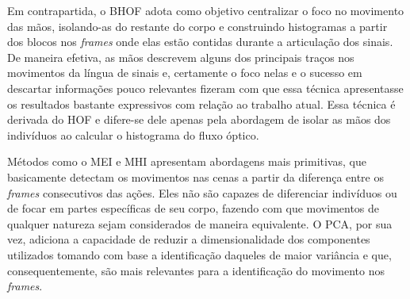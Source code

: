 Em contrapartida, o BHOF \cite{lim-2016} adota como objetivo centralizar o foco no movimento das mãos, isolando-as do restante do corpo e construindo histogramas a partir dos blocos nos \textit{frames} onde elas estão contidas durante a articulação dos sinais. De maneira efetiva, as mãos descrevem alguns dos principais traços nos movimentos da língua de sinais e, certamente o foco nelas e o sucesso em descartar informações pouco relevantes fizeram com que essa técnica apresentasse os resultados bastante expressivos com relação ao trabalho atual. Essa técnica é derivada do HOF e difere-se dele apenas pela abordagem de isolar as mãos dos indivíduos ao calcular o histograma do fluxo óptico.

Métodos como o MEI e MHI apresentam abordagens mais primitivas, que basicamente detectam os movimentos nas cenas a partir da diferença entre os \textit{frames} consecutivos das ações. Eles não são capazes de diferenciar indivíduos ou de focar em partes específicas de seu corpo, fazendo com que movimentos de qualquer natureza sejam considerados de maneira equivalente. O PCA, por sua vez, adiciona a capacidade de reduzir a dimensionalidade dos componentes utilizados tomando com base a identificação daqueles de maior variância e que, consequentemente, são mais relevantes para a identificação do movimento nos \textit{frames}. 







